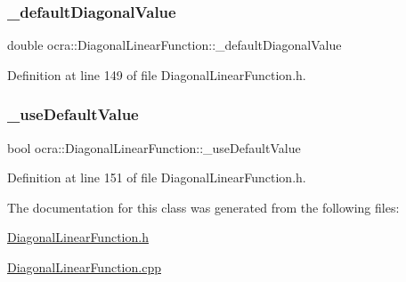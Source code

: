 \subsubsection{\texorpdfstring{\+\_\+default\+Diagonal\+Value}{\_defaultDiagonalValue}}
{\footnotesize\ttfamily double ocra\+::\+Diagonal\+Linear\+Function\+::\+\_\+default\+Diagonal\+Value\hspace{0.3cm}{\ttfamily [protected]}}



Definition at line 149 of file Diagonal\+Linear\+Function.\+h.

\hypertarget{classocra_1_1DiagonalLinearFunction_a27e25618f0812c42967b363ad3f77fd6}{}\label{classocra_1_1DiagonalLinearFunction_a27e25618f0812c42967b363ad3f77fd6} 
\subsubsection{\texorpdfstring{\+\_\+use\+Default\+Value}{\_useDefaultValue}}
{\footnotesize\ttfamily bool ocra\+::\+Diagonal\+Linear\+Function\+::\+\_\+use\+Default\+Value\hspace{0.3cm}{\ttfamily [protected]}}



Definition at line 151 of file Diagonal\+Linear\+Function.\+h.



The documentation for this class was generated from the following files\+:\begin{DoxyCompactItemize}
\item 
\hyperlink{DiagonalLinearFunction_8h}{Diagonal\+Linear\+Function.\+h}\item 
\hyperlink{DiagonalLinearFunction_8cpp}{Diagonal\+Linear\+Function.\+cpp}\end{DoxyCompactItemize}
